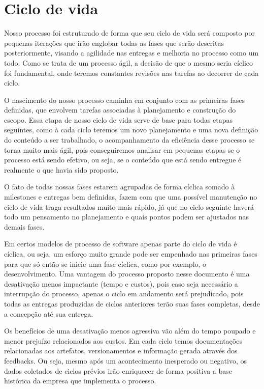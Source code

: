 \documentclass[	DIV=calc,%
							paper=a4,%
							fontsize=12pt,%
							onecolumn]{scrartcl}	 					%
\begin{document}
\section{Ciclo de vida}
Nosso processo foi estruturado de forma que seu ciclo de vida será composto por pequenas iterações que irão englobar todas as fases que serão descritas posteriormente, visando a agilidade nas entregas e melhoria no processo como um todo. Como se trata de um processo ágil, a decisão de que o mesmo seria cíclico foi fundamental, onde teremos constantes revisões nas tarefas ao decorrer de cada ciclo.  

O nascimento do nosso processo caminha em conjunto com as primeiras fases definidas, que envolvem tarefas associadas à planejamento e construção do escopo. Essa etapa de nosso ciclo de vida serve de base para todas etapas seguintes, como à cada ciclo teremos um novo planejamento e uma nova definição do conteúdo a ser trabalhado, o acompanhamento da eficiência desse processo se torna muito mais ágil, pois conseguiremos analisar em pequenas etapas se o processo está sendo efetivo, ou seja, se o conteúdo que está sendo entregue é realmente o que havia sido proposto. 

O fato de todas nossas fases estarem agrupadas de forma cíclica somado à milestones e entregas bem definidas, fazem com que uma possível manutenção no ciclo de vida traga resultados muito mais rápido, já que no ciclo seguinte haverá todo um pensamento no planejamento e quais pontos podem ser ajustados nas demais fases. 

Em certos modelos de processo de software apenas parte do ciclo de vida é cíclica, ou seja, um esforço muito grande pode ser empenhado nas primeiras fases para que só então se inicie uma fase cíclica, como por exemplo, o desenvolvimento.  Uma vantagem do processo proposto nesse documento é uma desativação menos impactante (tempo e custos), pois caso seja necessário a interrupção do processo, apenas o ciclo em andamento será prejudicado, pois todas as entregas produzidas de ciclos anteriores terão suas fases completas, desde a concepção até sua entrega. 

Os benefícios de uma desativação menos agressiva vão além do tempo poupado e menor prejuízo relacionados aos custos. Em cada ciclo temos documentações relacionadas aos artefatos, versionamentos e informação gerada através dos feedbacks. Ou seja, mesmo após um acontecimento inesperado ou negativo, os dados coletados de ciclos prévios irão enriquecer de forma positiva a base histórica da empresa que implementa o processo. 
\end{document}
